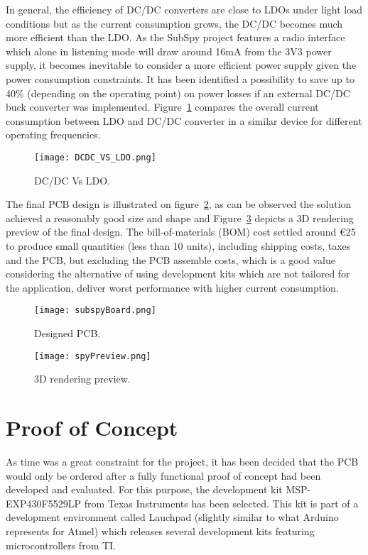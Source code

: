 \documentclass[12pt]{article}
\begin{document}
In general, the efficiency of DC/DC converters are close to LDOs under light load conditions but as the current consumption grows, the DC/DC becomes much more efficient than the LDO. As the SubSpy project features a radio interface which alone in listening mode will draw around 16mA from the 3V3 power supply, it becomes inevitable to consider a more efficient power supply given the power consumption constraints. It has been identified a possibility to save up to 40\% (depending on the operating point) on power losses if an external DC/DC buck converter was implemented. Figure~\ref{fig:DCDC_VS_LDO} compares the overall current consumption between LDO and DC/DC converter in a similar device for different operating frequencies. 

\begin{figure}[H]
    \centering
    \texttt{[image: DCDC\_VS\_LDO.png]}
    \caption{DC/DC Vs LDO.}
    \label{fig:DCDC_VS_LDO}
\end{figure}

The final PCB design is illustrated on figure~\ref{fig:subspyBoard}, as can be observed the solution achieved a reasonably good size and shape and Figure~\ref{fig:spyPreview} depicts a 3D rendering preview of the final design. The bill-of-materials (BOM) cost settled around \euro 25 to produce small quantities (less than 10 units), including shipping costs, taxes and the PCB, but excluding the PCB assemble costs, which is a good value considering the alternative of using development kits which are not tailored for the application, deliver worst performance with higher current consumption.

\begin{figure}[H]
    \centering
    \texttt{[image: subspyBoard.png]}
    \caption{Designed PCB.}
    \label{fig:subspyBoard}
\end{figure}

\begin{figure}[H]
    \centering
    \texttt{[image: spyPreview.png]}
    \caption{3D rendering preview.}
    \label{fig:spyPreview}
\end{figure}

\newpage
\section{Proof of Concept}
\label{proofOfConcept}
As time was a great constraint for the project, it has been decided that the PCB would only be ordered after a fully functional proof of concept had been developed and evaluated. For this purpose, the development kit MSP-EXP430F5529LP from Texas Instruments has been selected. This kit is part of a development environment called Lauchpad (slightly similar to what Arduino represents for Atmel) which releases several development kits featuring microcontrollers from TI.
\end{document}
